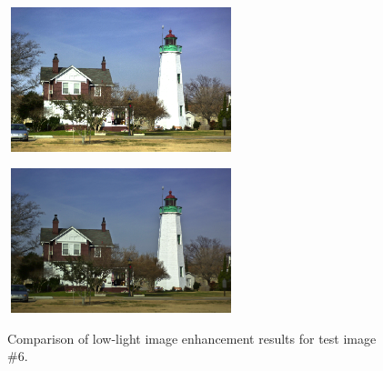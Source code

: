 \begin{figure}[htbp]
\begin{minipage}[b]{0.49\hsize}
		 \label{fig:qualitative/1/rrm}
	\end{minipage} 
	\begin{minipage}[b]{0.49\hsize}
	\centering
	\includegraphics[width=66mm, height=42mm]{images/experiment/qualitative/comp1/1/lime.eps}
	 \label{fig:qualitative/1/lime}
	\end{minipage}
	\begin{minipage}[b]{0.49\hsize}
	\centering
	\includegraphics[width=66mm, height=42mm]{images/experiment/qualitative/comp1/1/prop.eps}
	 \label{fig:qualitative/1/prop}
	\end{minipage}
	\caption{Comparison of low-light image enhancement results for test image $\#6$.}
	\label{fig:qualitative/1}
\end{figure}
